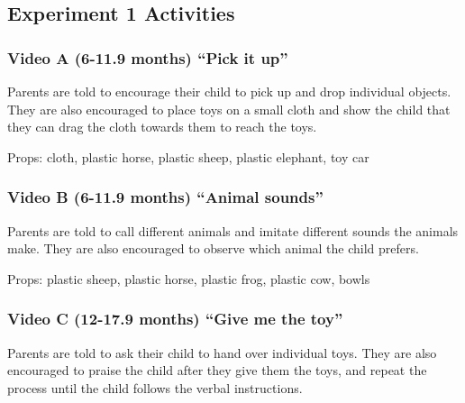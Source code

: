 \documentclass[man,floatsintext]{apa6}
\begin{document}
\endgroup

\clearpage
\makeatletter
\efloat@restorefloats
\makeatother


\begin{appendix}
\section{}
\hypertarget{experiment-1-activities}{%
\subsection{Experiment 1 Activities}\label{experiment-1-activities}}

\hypertarget{video-a-6-11.9-months-pick-it-up}{%
\subsubsection{Video A (6-11.9 months) ``Pick it
up''}\label{video-a-6-11.9-months-pick-it-up}}

Parents are told to encourage their child to pick up and drop individual
objects. They are also encouraged to place toys on a small cloth and
show the child that they can drag the cloth towards them to reach the
toys.

Props: cloth, plastic horse, plastic sheep, plastic elephant, toy car

\hypertarget{video-b-6-11.9-months-animal-sounds}{%
\subsubsection{Video B (6-11.9 months) ``Animal
sounds''}\label{video-b-6-11.9-months-animal-sounds}}

Parents are told to call different animals and imitate different sounds
the animals make. They are also encouraged to observe which animal the
child prefers.

Props: plastic sheep, plastic horse, plastic frog, plastic cow, bowls

\hypertarget{video-c-12-17.9-months-give-me-the-toy}{%
\subsubsection{Video C (12-17.9 months) ``Give me the
toy''}\label{video-c-12-17.9-months-give-me-the-toy}}

Parents are told to ask their child to hand over individual toys. They
are also encouraged to praise the child after they give them the toys,
and repeat the process until the child follows the verbal instructions.


\end{appendix}
\end{document}
